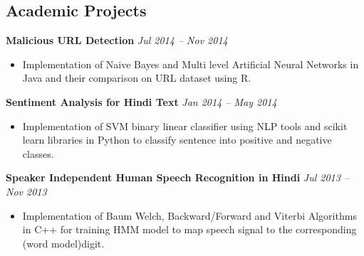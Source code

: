 \documentclass[margin,line]{resume}
\begin{document}
\begin{resume}
    
    \section{\mysidestyle Academic Projects}
    \textbf{Malicious URL Detection} \hfill \textsl{Jul 2014 -- Nov 2014} \vspace{0mm}\\\vspace{0mm}%
       \begin{itemize}
	        \item Implementation of Naive Bayes and Multi level Artificial Neural Networks in Java and their comparison on URL dataset using R.
       \end{itemize}

    \textbf{Sentiment Analysis for Hindi Text} \hfill \textsl{Jan 2014 -- May 2014} \vspace{0mm}\\\vspace{0mm}%
       \begin{itemize} 
            \item Implementation of SVM binary linear classifier using NLP tools and scikit learn libraries in Python to classify sentence into positive and negative classes.
       \end{itemize}


    \textbf{Speaker Independent Human Speech Recognition in Hindi} \hfill \textsl{Jul 2013 -- Nov 2013} \vspace{0mm}\\\vspace{0mm}%
       \begin{itemize}
            \item Implementation of Baum Welch, Backward/Forward and Viterbi Algorithms in C++ for training HMM model to map speech signal to the corresponding (word model)digit.
       \end{itemize}



\end{resume}
\end{document}
